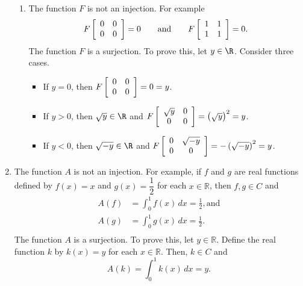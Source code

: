 \begin{enumerate}
\begin{enumerate}
\item The function $F$ is not an injection.  For example
\[
F \left[ {\begin{array}{*{20}c}
   0 & 0  \\
   0 & 0  \\
\end{array} } \right] =  0 \qquad \text{and} \qquad
F \left[ {\begin{array}{*{20}c}
   1 & 1  \\
   1 & 1  \\
\end{array} } \right] =  0.
\]
The function $F$ is a surjection.  To prove this, let $y \in \R$.  Consider three cases.
\begin{itemize}
\item If $y = 0$, then $F \left[ {\begin{array}{*{20}c}
   0 & 0  \\
   0 & 0  \\
\end{array} } \right] =  0 = y$.

\item If $y > 0$, then $\sqrt{y} \in \R$ and $F \left[ {\begin{array}{*{20}c}
   \sqrt{y} & 0  \\
   0 & 0  \\
\end{array} } \right] =  \left( \sqrt{y} \right)^2 = y$.

\item If $y < 0$, then $\sqrt{-y} \in \R$ and $F \left[ {\begin{array}{*{20}c}
   0 & \sqrt{-y}  \\
   0 & 0  \\
\end{array} } \right] =  -\left( \sqrt{-y} \right)^2 = y$.

\end{itemize}

\end{enumerate}



\item The function $A$ is not an injection.  For example, if $f$ and $g$ are real functions defined by $f ( x ) = x$ and $g ( x ) = \dfrac{1}{2}$ for each 
$x \in \mathbb{R}$, then $f, g \in C$ and
\[
\begin{aligned}
A ( f ) &= \int_0^1 {f( x ) \, dx} = \frac{1}{2}, \text{and} \\
A ( g ) &= \int_0^1 {g( x ) \, dx} = \frac{1}{2}. \\
\end{aligned}
\]
The function $A$ is a surjection.  To prove this, let $y \in \mathbb{R}$.  Define the real function $k$ by $k ( x ) = y$ for each $x \in \mathbb{R}$.  Then, $k \in C$ and 
\[
A ( k ) = \int_0^1 {k( x ) \, dx} = y.
\]



\end{enumerate}
